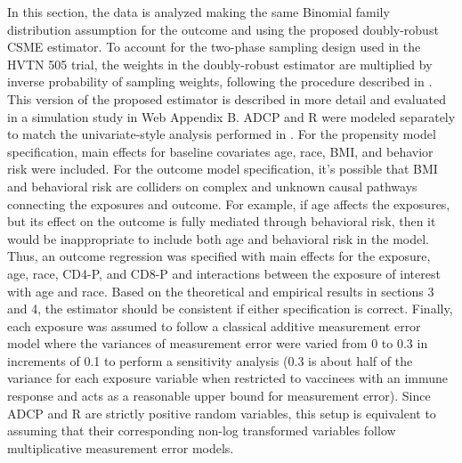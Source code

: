 \documentclass[useAMS,usenatbib,referee]{biom}
\newcommand{\RNum}[1]{\uppercase\expandafter{\romannumeral #1\relax}}
\begin{document}
In this section, the data is analyzed making the same Binomial family distribution assumption for the outcome and using the proposed doubly-robust CSME estimator. To account for the two-phase sampling design used in the HVTN 505 trial, the weights in the doubly-robust estimator are multiplied by inverse probability of sampling weights, following the procedure described in \citet{wang2009}. This version of the proposed estimator is described in more detail and evaluated in a simulation study in Web Appendix B. ADCP and R\RNum{2} were modeled separately to match the univariate-style analysis performed in \citet{neidich2019}. For the propensity model specification, main effects for baseline covariates age, race, BMI, and behavior risk were included. For the outcome model specification, it's possible that BMI and behavioral risk are colliders on complex and unknown causal pathways connecting the exposures and outcome. For example, if age affects the exposures, but its effect on the outcome is fully mediated through behavioral risk, then it would be inappropriate to include both age and behavioral risk in the model. Thus, an outcome regression was specified with main effects for the exposure, age, race, CD4-P, and CD8-P and interactions between the exposure of interest with age and race. Based on the theoretical and empirical results in sections 3 and 4, the estimator should be consistent if either specification is correct. Finally, each exposure was assumed to follow a classical additive measurement error model where the variances of measurement error were varied from 0 to 0.3 in increments of 0.1 to perform a sensitivity analysis (0.3 is about half of the variance for each exposure variable when restricted to vaccinees with an immune response and acts as a reasonable upper bound for measurement error). Since ADCP and R\RNum{2} are strictly positive random variables, this setup is equivalent to assuming that their corresponding non-log transformed variables follow multiplicative measurement error models.
\end{document}
